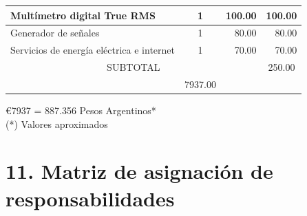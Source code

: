 \documentclass[11pt]{charter}
\begin{document}
\begin{table}[htpb]
\begin{tabularx}{\linewidth}{@{}|X|c|r|r|@{}}
\multicolumn{1}{|l|}{Multímetro digital True RMS}
	&
   1&
   100.00&
   100.00\\ \hline
   
   
\multicolumn{1}{|l|}{Generador de señales} &
1&
80.00&
80.00\\ \hline


\multicolumn{1}{|l|}{Servicios de energía eléctrica e internet} &
1&
70.00&
70.00\\ \hline
   
\multicolumn{3}{|c|}{SUBTOTAL} &
  \multicolumn{1}{c|}{250.00} \\ \hline
\rowcolor[HTML]{C0C0C0}
\multicolumn{3}{|c|}{TOTAL} &
   7937.00\\ \hline
\end{tabularx}%
\end{table}
\euro{7937} = 887.356 Pesos Argentinos*\\
(*) Valores aproximados

\section{11. Matriz de asignación de responsabilidades}
\label{sec:responsabilidades}
\end{document}

